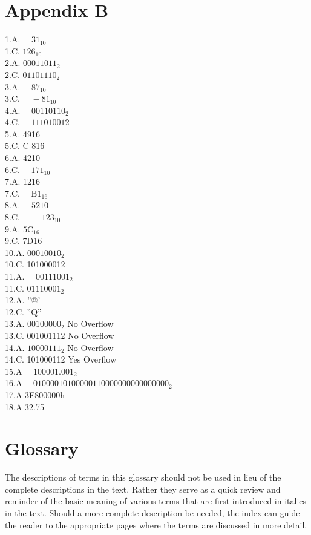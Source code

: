 \documentclass[10pt]{article}
\begin{document}
\section*{Appendix B}
1.A. $\quad 31_{10}$\\
1.C. $126_{10}$\\
2.A. $00011011_{2}$\\
2.C. $01101110_{2}$\\
3.A. $\quad 87{ }_{10}$\\
3.C. $\quad-81_{10}$\\
4.A. $\quad 00110110_{2}$\\
4.C. $\quad 111010012$\\
5.A. 4916\\
5.C. C 816\\
6.A. 4210\\
6.C. $\quad 171_{10}$\\
7.A. 1216\\
7.C. $\quad \mathrm{B} 1_{16}$\\
8.A. $\quad 5210$\\
8.C. $\quad-123_{10}$\\
9.A. $5 \mathrm{C}_{16}$\\
9.C. 7D16\\
10.A. $00010010_{2}$\\
10.C. 101000012\\
11.A. $\quad 00111001_{2}$\\
11.C. $01110001_{2}$\\
12.A. ''@'\\
12.C. ''Q''\\
13.A. $00100000_{2}$ No Overflow\\
13.C. 001001112 No Overflow\\
14.A. $10000111_{2}$ No Overflow\\
14.C. 101000112 Yes Overflow\\
15.A $\quad 100001.001_{2}$\\
16.A $\quad 01000010100000110000000000000000_{2}$\\
17.A 3F800000h\\
18.A 32.75

\section*{Glossary}
The descriptions of terms in this glossary should not be used in lieu of the complete descriptions in the text. Rather they serve as a quick review and reminder of the basic meaning of various terms that are first introduced in italics in the text. Should a more complete description be needed, the index can guide the reader to the appropriate pages where the terms are discussed in more detail.
\end{document}
